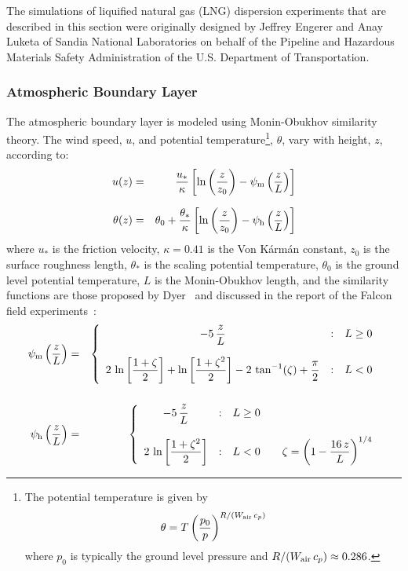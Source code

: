 The simulations of liquified natural gas (LNG) dispersion experiments that are described in this section were originally designed by Jeffrey Engerer and Anay Luketa of Sandia National Laboratories on behalf of the Pipeline and Hazardous Materials Safety Administration of the U.S. Department of Transportation.

\subsubsection{Atmospheric Boundary Layer}

The atmospheric boundary layer is modeled using Monin-Obukhov similarity theory. The wind speed, $u$, and potential temperature\footnote{The potential temperature is given by $$\theta=T \left( \frac{p_0}{p} \right)^{R/(W_{\rm air} \, c_p)}$$ where $p_0$ is typically the ground level pressure and $R/(W_{\rm air} \, c_p) \approx 0.286$.}, $\theta$, vary with height, $z$, according to:
\begin{eqnarray}
   u(z)      &=&            \frac{u_*}{\kappa}     \left[ \ln \left( \frac{z}{z_0} \right) - \psi_{\rm m} \left( \frac{z}{L} \right) \right] \label{u_om} \\[.1in]
   \theta(z) &=& \theta_0 + \frac{\theta_*}{\kappa} \left[ \ln \left( \frac{z}{z_0} \right) - \psi_{\rm h} \left( \frac{z}{L} \right) \right]
\end{eqnarray}
where $u_*$ is the friction velocity, $\kappa=0.41$ is the Von K\'{a}rm\'{a}n constant, $z_0$ is the surface roughness length, $\theta_*$ is the scaling potential temperature, $\theta_0$ is the ground level potential temperature, $L$ is the Monin-Obukhov length, and the similarity functions are those proposed by Dyer~\cite{Dyer:1974} and discussed in the report of the Falcon field experiments~\cite{Falcon}:
\begin{eqnarray}
   \psi_{\rm m}\left(\frac{z}{L}\right) &=& \left\{ \begin{array}{c@{\quad:\quad}l} \displaystyle -5 \, \frac{z}{L} & L \ge 0 \\[.2in]  \displaystyle 2 \, \ln \left[\frac{1+\zeta}{2}\right] + \ln \left[\frac{1+\zeta^2}{2}\right]-2 \, \tan^{-1}(\zeta) + \frac{\pi}{2} & L<0 \end{array} \right.  \\[.2in]
   \psi_{\rm h}\left(\frac{z}{L}\right) &=& \left\{ \begin{array}{c@{\quad:\quad}l} \displaystyle -5 \, \frac{z}{L} & L \ge 0 \\[.2in]  \displaystyle 2 \, \ln \left[\frac{1+\zeta^2}{2}\right] & L<0 \quad \quad  \displaystyle \zeta=\left( 1 - \frac{16 \, z}{L} \right)^{1/4}  \end{array} \right.
\end{eqnarray}
